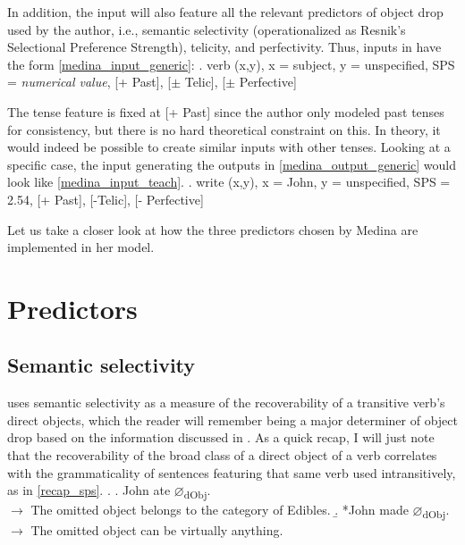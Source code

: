 In addition, the input will also feature all the relevant predictors of object drop used by the author, i.e., semantic selectivity (operationalized as Resnik's Selectional Preference Strength), telicity, and perfectivity. Thus, inputs in \textcite{Medina2007} have the form \ref{medina_input_generic}:
\ex. \label{medina_input_generic} verb (x,y), x = subject, y = unspecified, SPS = \textit{numerical value}, [+ Past], [$\pm$ Telic], [$\pm$ Perfective]

The tense feature is fixed at [+ Past] since the author only modeled past tenses for consistency, but there is no hard theoretical constraint on this. In theory, it would indeed be possible to create similar inputs with other tenses. Looking at a specific case, the input generating the outputs in \ref{medina_output_generic} would look like \ref{medina_input_teach}.
\ex. \label{medina_input_teach} write (x,y), x = John, y = unspecified, SPS = 2.54, [+ Past], [-Telic], [- Perfective]

Let us take a closer look at how the three predictors chosen by Medina are implemented in her model.


\section{Predictors} 

\subsection{Semantic selectivity} \textcite{Medina2007} uses semantic selectivity as a measure of the recoverability of a transitive verb's direct objects, which the reader will remember being a major determiner of object drop based on the information discussed in . As a quick recap, I will just note that the recoverability of the broad class of a direct object of a verb correlates with the grammaticality of sentences featuring that same verb used intransitively, as in \ref{recap_sps}.
\ex. \label{recap_sps} \a. John ate $\varnothing$\textsubscript{dObj}. \\ $\longrightarrow$ The omitted object belongs to the category of Edibles.
\b. *John made $\varnothing$\textsubscript{dObj}. \\ $\longrightarrow$ The omitted object can be virtually anything.

